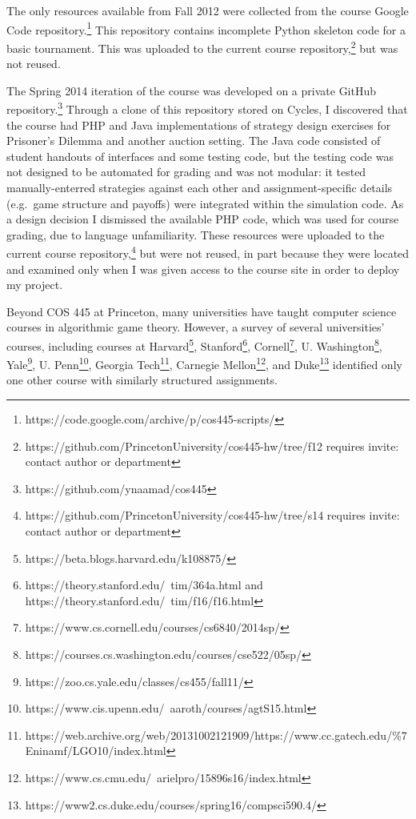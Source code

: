 \documentclass[pageno]{jpaper}
\begin{document}
The only resources available from Fall 2012 were collected from the course Google Code repository.\footnote{https://code.google.com/archive/p/cos445-scripts/}
This repository contains incomplete Python skeleton code for a basic tournament.
This was uploaded to the current course repository,\footnote{https://github.com/PrincetonUniversity/cos445-hw/tree/f12 requires invite: contact author or department} but was not reused.

The Spring 2014 iteration of the course was developed on a private GitHub repository.\footnote{https://github.com/ynaamad/cos445}
Through a clone of this repository stored on Cycles, I discovered that the course had PHP and Java implementations of strategy design exercises for Prisoner's Dilemma and another auction setting.
The Java code consisted of student handouts of interfaces and some testing code, but the testing code was not designed to be automated for grading and was not modular: it tested manually-enterred strategies against each other and assignment-specific details (e.g.\ game structure and payoffs) were integrated within the simulation code.
As a design decision I dismissed the available PHP code, which was used for course grading, due to language unfamiliarity.
These resources were uploaded to the current course repository,\footnote{https://github.com/PrincetonUniversity/cos445-hw/tree/s14 requires invite: contact author or department} but were not reused, in part because they were located and examined only when I was given access to the course site in order to deploy my project.

Beyond COS 445 at Princeton, many universities have taught computer science courses in algorithmic game theory.
However, a survey of several universities' courses, including courses at Harvard\footnote{https://beta.blogs.harvard.edu/k108875/}, Stanford\footnote{https://theory.stanford.edu/~tim/364a.html and https://theory.stanford.edu/~tim/f16/f16.html}, Cornell\footnote{https://www.cs.cornell.edu/courses/cs6840/2014sp/}, U. Washington\footnote{https://courses.cs.washington.edu/courses/cse522/05sp/}, Yale\footnote{https://zoo.cs.yale.edu/classes/cs455/fall11/}, U. Penn\footnote{https://www.cis.upenn.edu/~aaroth/courses/agtS15.html}, Georgia Tech\footnote{https://web.archive.org/web/20131002121909/https://www.cc.gatech.edu/\%7Eninamf/LGO10/index.html}, Carnegie Mellon\footnote{https://www.cs.cmu.edu/~arielpro/15896s16/index.html}, and Duke\footnote{https://www2.cs.duke.edu/courses/spring16/compsci590.4/} identified only one other course with similarly structured assignments.
\end{document}
